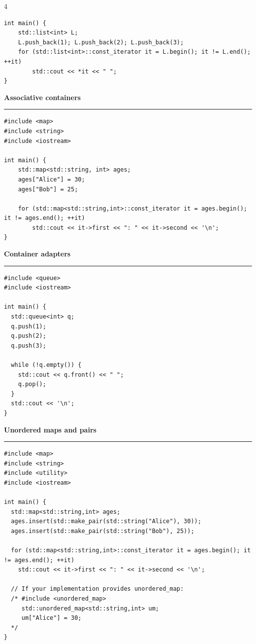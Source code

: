 \documentclass[final]{beamer}
\renewcommand{\subsection}[1]{%
  \par\vspace{1em}%
  {\noindent\large\bfseries #1\par}%
  \vspace{0.5em}\hrule\vspace{1em}%
}
\begin{document}
\begin{frame}[t,fragile]
\begin{multicols}{4}
\begin{lstlisting}
int main() {
    std::list<int> L;
    L.push_back(1); L.push_back(2); L.push_back(3);
    for (std::list<int>::const_iterator it = L.begin(); it != L.end(); ++it)
        std::cout << *it << " ";
}
\end{lstlisting}

\subsection{Associative containers}

\begin{lstlisting}
#include <map>
#include <string>
#include <iostream>

int main() {
    std::map<std::string, int> ages;
    ages["Alice"] = 30;
    ages["Bob"] = 25;

    for (std::map<std::string,int>::const_iterator it = ages.begin(); it != ages.end(); ++it)
        std::cout << it->first << ": " << it->second << '\n';
}
\end{lstlisting}

\subsection{Container adapters}

\begin{lstlisting}
#include <queue>
#include <iostream>

int main() {
  std::queue<int> q;
  q.push(1);
  q.push(2);
  q.push(3);

  while (!q.empty()) {
    std::cout << q.front() << " ";
    q.pop();
  }
  std::cout << '\n';
}
\end{lstlisting}

\subsection{Unordered maps and pairs}

\begin{lstlisting}
#include <map>
#include <string>
#include <utility>
#include <iostream>

int main() {
  std::map<std::string,int> ages;
  ages.insert(std::make_pair(std::string("Alice"), 30));
  ages.insert(std::make_pair(std::string("Bob"), 25));

  for (std::map<std::string,int>::const_iterator it = ages.begin(); it != ages.end(); ++it)
    std::cout << it->first << ": " << it->second << '\n';

  // If your implementation provides unordered_map:
  /* #include <unordered_map>
     std::unordered_map<std::string,int> um;
     um["Alice"] = 30;
  */
}
\end{lstlisting}


\end{multicols}
\end{frame}
\end{document}
